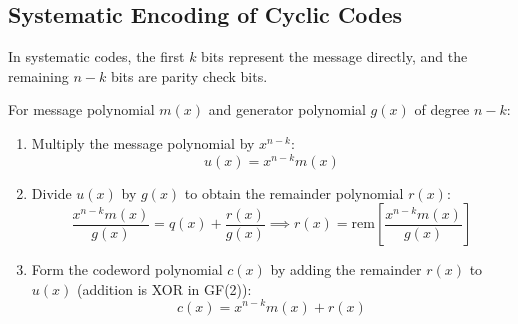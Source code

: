 \documentclass[12pt,a4paper]{article}
\begin{document}
\subsection{Systematic Encoding of Cyclic Codes}
In systematic codes, the first $k$ bits represent the message directly, and the remaining $n-k$ bits are parity check bits.
\begin{tcolorbox}[formulabox, title={\textbf{Systematic Cyclic Coding Steps}}]
For message polynomial $m(x)$ and generator polynomial $g(x)$ of degree $n-k$:
\begin{enumerate}[label=\textbf{Step \arabic*:}, leftmargin=4.5em, itemsep=2pt, topsep=1pt]
  \item Multiply the message polynomial by $x^{n-k}$:
    \begin{equation*}
      u(x) = x^{n-k} m(x)
    \end{equation*}
  \item Divide $u(x)$ by $g(x)$ to obtain the remainder polynomial $r(x)$:
    \begin{equation*}
      \frac{x^{n-k} m(x)}{g(x)} = q(x) + \frac{r(x)}{g(x)} \implies r(x) = \text{rem}\left[ \frac{x^{n-k} m(x)}{g(x)} \right]
    \end{equation*}
  \item Form the codeword polynomial $c(x)$ by adding the remainder $r(x)$ to $u(x)$ (addition is XOR in GF(2)):
    \begin{equation}
      c(x) = x^{n-k} m(x) + r(x)
    \end{equation}
\end{enumerate}
\end{tcolorbox}
\end{document}
